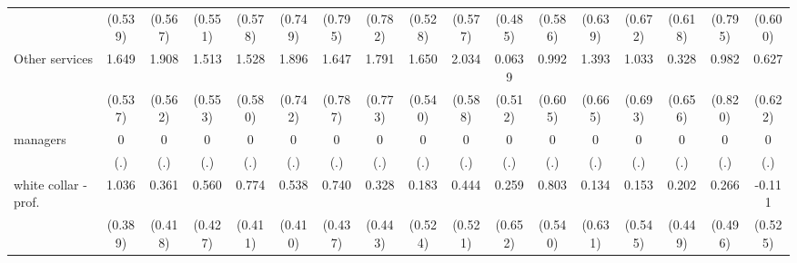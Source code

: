 {\begin{tabular}{l*{16}{c}}
                    &     (0.539)         &     (0.567)         &     (0.551)         &     (0.578)         &     (0.749)         &     (0.795)         &     (0.782)         &     (0.528)         &     (0.577)         &     (0.485)         &     (0.586)         &     (0.639)         &     (0.672)         &     (0.618)         &     (0.795)         &     (0.600)         \\
[1em]
Other services      &       1.649\sym{**} &       1.908\sym{***}&       1.513\sym{**} &       1.528\sym{**} &       1.896\sym{*}  &       1.647\sym{*}  &       1.791\sym{*}  &       1.650\sym{**} &       2.034\sym{***}&      0.0639         &       0.992         &       1.393\sym{*}  &       1.033         &       0.328         &       0.982         &       0.627         \\
                    &     (0.537)         &     (0.562)         &     (0.553)         &     (0.580)         &     (0.742)         &     (0.787)         &     (0.773)         &     (0.540)         &     (0.588)         &     (0.512)         &     (0.605)         &     (0.665)         &     (0.693)         &     (0.656)         &     (0.820)         &     (0.622)         \\
[1em]
managers            &           0         &           0         &           0         &           0         &           0         &           0         &           0         &           0         &           0         &           0         &           0         &           0         &           0         &           0         &           0         &           0         \\
                    &         (.)         &         (.)         &         (.)         &         (.)         &         (.)         &         (.)         &         (.)         &         (.)         &         (.)         &         (.)         &         (.)         &         (.)         &         (.)         &         (.)         &         (.)         &         (.)         \\
[1em]
white collar - prof.&       1.036\sym{**} &       0.361         &       0.560         &       0.774         &       0.538         &       0.740         &       0.328         &       0.183         &       0.444         &       0.259         &       0.803         &       0.134         &       0.153         &       0.202         &       0.266         &      -0.111         \\
                    &     (0.389)         &     (0.418)         &     (0.427)         &     (0.411)         &     (0.410)         &     (0.437)         &     (0.443)         &     (0.524)         &     (0.521)         &     (0.652)         &     (0.540)         &     (0.631)         &     (0.545)         &     (0.449)         &     (0.496)         &     (0.525)         \\

\end{tabular}}
